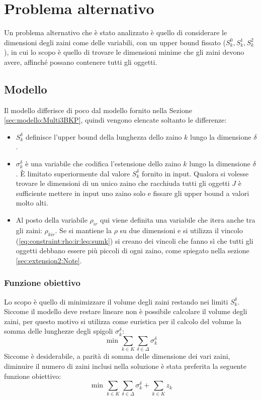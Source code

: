 \section{Problema alternativo}
\label{sec:extension2}
Un problema alternativo che è  stato analizzato è quello di considerare le 
dimensioni degli zaini come delle variabili, con un upper bound fissato 
($S_k^0, S_k^1, S_k^2$), in cui lo scopo è quello di trovare le dimensioni 
minime che gli zaini devono avere, affinché possano contenere tutti gli oggetti.

\subsection{Modello}
Il modello differisce di poco dal modello fornito nella
Sezione \ref{sec:modello:Multi3BKP}, quindi vengono elencate soltanto le 
differenze:
\begin{itemize}
	\item $S_k^\delta$ definisce l'upper bound della lunghezza dello zaino $k$ 
	lungo la dimensione $\delta$.
	
	\item $\sigma_k^\delta$ è una variabile che codifica l'estensione dello 
	zaino $k$ lungo la dimensione $\delta$. È limitato superiormente dal valore
	$S_k^\delta$ fornito in input.
	Qualora si volesse trovare le dimensioni di un unico zaino che racchiuda 
	tutti gli oggetti $J$ è sufficiente	mettere in input uno zaino solo e 
	fissare gli upper bound a valori molto alti. 
	
	\item Al posto della variabile $\rho_{ir}$ qui viene definita una variabile
	che itera anche tra gli zaini: $\rho_{kir}$. 
	Se si mantiene la $\rho$ su due dimensioni e si utilizza il vincolo 
	(\ref{eq:constraint:rho:ir:leq:sumk}) si creano dei vincoli che fanno sì 
	che tutti gli oggetti debbano essere più piccoli di ogni zaino,
	come spiegato nella sezione \ref{sec:extension2:Note}.
\end{itemize}
\subsubsection{Funzione obiettivo}
Lo scopo è quello di minimizzare il volume degli zaini restando nei limiti 
$S_k^\delta$. Siccome il modello deve restare lineare non è possibile calcolare
il volume degli zaini, per questo motivo si utilizza come euristica per il 
calcolo del volume la somma delle lunghezze degli spigoli $\sigma_k^\delta$:
\begin{equation}
\text{ min } \sum_{k \in K} \sum_{\delta \in \Delta} \sigma_k^\delta
\end{equation}
Siccome è desiderabile, a parità di somma delle dimensione dei vari zaini,
diminuire il numero di zaini inclusi nella soluzione è stata preferita la 
seguente funzione obiettivo:
\begin{equation}
\text{ min } \sum_{k \in K} \sum_{\delta \in \Delta} \sigma_k^\delta 
+ \sum_{k \in K} z_k
\end{equation}

